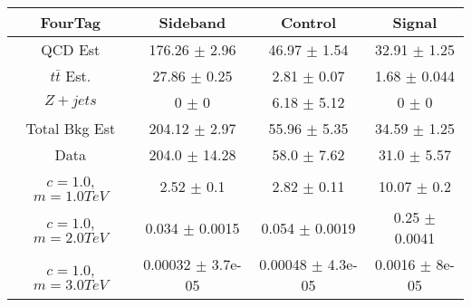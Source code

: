 \begin{footnotesize} 
\begin{tabular}{c|c|c|c} 
FourTag & Sideband & Control & Signal \\ 
\hline\hline 
QCD Est & 176.26 $\pm$ 2.96 & 46.97 $\pm$ 1.54 & 32.91 $\pm$ 1.25\\ 
$t\bar{t}$ Est.  & 27.86 $\pm$ 0.25 & 2.81 $\pm$ 0.07 & 1.68 $\pm$ 0.044\\ 
$Z+jets$ & 0 $\pm$ 0 & 6.18 $\pm$ 5.12 & 0 $\pm$ 0\\ 
Total Bkg Est & 204.12 $\pm$ 2.97 & 55.96 $\pm$ 5.35 & 34.59 $\pm$ 1.25\\ 
Data & 204.0 $\pm$ 14.28 & 58.0 $\pm$ 7.62 & 31.0 $\pm$ 5.57\\ 
$c=1.0$,$m=1.0TeV$ & 2.52 $\pm$ 0.1 & 2.82 $\pm$ 0.11 & 10.07 $\pm$ 0.2\\ 
$c=1.0$,$m=2.0TeV$ & 0.034 $\pm$ 0.0015 & 0.054 $\pm$ 0.0019 & 0.25 $\pm$ 0.0041\\ 
$c=1.0$,$m=3.0TeV$ & 0.00032 $\pm$ 3.7e-05 & 0.00048 $\pm$ 4.3e-05 & 0.0016 $\pm$ 8e-05\\ 
\hline\hline 
\end{tabular} 
\end{footnotesize} 
\newline 
